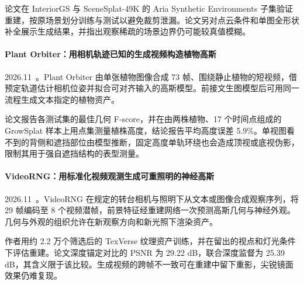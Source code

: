 论文在 InteriorGS 与 SceneSplat-49K 的 Aria Synthetic Environments 子集验证重建，按原场景划分训练与测试以避免裁剪泄漏。论文另对点云条件和单图全形状补全展示生成结果，并指出观察稀疏的场景边界仍可能较真值模糊。

\paragraph{Plant Orbiter：用相机轨迹已知的生成视频构造植物高斯}
2026.11~\cite{2611_12739}。Plant Orbiter 由单张植物图像合成 73 帧、围绕静止植物的短视频，借预定轨道估计相机位姿并拟合可对齐输入的高斯模型。前接文生图模型后可用同一流程生成文本指定的植物资产。

论文报告各测试集的最佳几何 F-score，并在由两株植物、17 个时间点组成的 GrowSplat 样本上用点集测量植株高度，结论报告平均高度误差 5.9\%。单视图看不到的背侧和遮挡部位由模型推断，固定高度单轨环绕也会造成顶视或底视伪影，限制其用于强自遮挡结构的表型测量。

\paragraph{VideoRNG：用标准化视频观测生成可重照明的神经高斯}
2026.11~\cite{2611_25338}。VideoRNG 在规定的转台相机与照明下从文本或图像合成观察序列，将 29 帧编码至 8 个视频潜帧，前景特征经重建网络一次预测高斯几何与神经外观。几何与外观的组织允许在新观察方向和新光照下渲染资产。

作者用约 2.2 万个筛选后的 TexVerse 纹理资产训练，并在留出的视点和灯光条件下评估重建。论文深度锚定对比的 PSNR 为 29.22 dB，联合深度监督为 25.39 dB，其含义限于该比较。生成视频的跨帧不一致可在重建中留下重影，尖锐镜面效果仍难复现。
